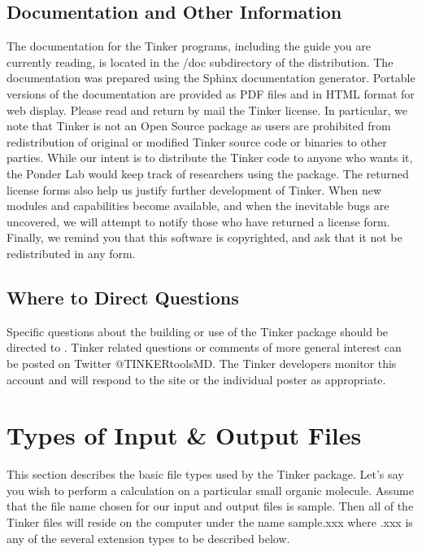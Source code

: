 \documentclass[letterpaper,11pt,english]{sphinxmanual}
\begin{document}
\section{Documentation and Other Information}
\label{\detokenize{text/installation:documentation-and-other-information}}
The documentation for the Tinker programs, including the guide you are currently reading, is located in the /doc subdirectory of the distribution. The documentation was prepared using the Sphinx documentation generator. Portable versions of the documentation are provided as PDF files and in HTML format for web display. Please read and return by mail the Tinker license. In particular, we note that Tinker is not an Open Source package as users are prohibited from redistribution of original or modified Tinker source code or binaries to other parties. While our intent is to distribute the Tinker code to anyone who wants it, the Ponder Lab would keep track of researchers using the package. The returned license forms also help us justify further development of Tinker. When new modules and capabilities become available, and when the inevitable bugs are uncovered, we will attempt to notify those who have returned a license form. Finally, we remind you that this software is copyrighted, and ask that it not be redistributed in any form.


\section{Where to Direct Questions}
\label{\detokenize{text/installation:where-to-direct-questions}}
Specific questions about the building or use of the Tinker package should be directed to . Tinker related questions or comments of more general interest can be posted on Twitter @TINKERtoolsMD. The Tinker developers monitor this account and will respond to the site or the individual poster as appropriate.


\chapter{Types of Input \& Output Files}
\label{\detokenize{text/file-types:types-of-input-output-files}}\label{\detokenize{text/file-types::doc}}
This section describes the basic file types used by the Tinker package. Let’s say you wish to perform a calculation on a particular small organic molecule. Assume that the file name chosen for our input and output files is sample. Then all of the Tinker files will reside on the computer under the name sample.xxx where .xxx is any of the several extension types to be described below.
\end{document}
